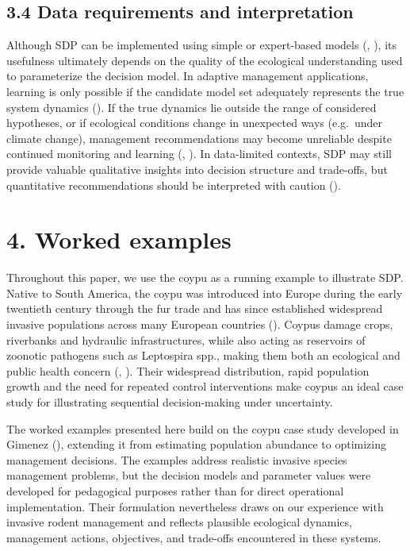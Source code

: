 \documentclass[
  11pt,
  a4paper,
]{article}
\begin{document}
\subsection{3.4 Data requirements and interpretation}\label{data-requirements-and-interpretation}

Although SDP can be implemented using simple or expert-based models (, ), its usefulness ultimately depends on the quality of the ecological understanding used to parameterize the decision model. In adaptive management applications, learning is only possible if the candidate model set adequately represents the true system dynamics (). If the true dynamics lie outside the range of considered hypotheses, or if ecological conditions change in unexpected ways (e.g.~under climate change), management recommendations may become unreliable despite continued monitoring and learning (, ). In data-limited contexts, SDP may still provide valuable qualitative insights into decision structure and trade-offs, but quantitative recommendations should be interpreted with caution ().

\section{4. Worked examples}\label{worked-examples}

Throughout this paper, we use the coypu as a running example to illustrate SDP. Native to South America, the coypu was introduced into Europe during the early twentieth century through the fur trade and has since established widespread invasive populations across many European countries (). Coypus damage crops, riverbanks and hydraulic infrastructures, while also acting as reservoirs of zoonotic pathogens such as Leptospira spp., making them both an ecological and public health concern (, ). Their widespread distribution, rapid population growth and the need for repeated control interventions make coypus an ideal case study for illustrating sequential decision-making under uncertainty.

The worked examples presented here build on the coypu case study developed in Gimenez (), extending it from estimating population abundance to optimizing management decisions. The examples address realistic invasive species management problems, but the decision models and parameter values were developed for pedagogical purposes rather than for direct operational implementation. Their formulation nevertheless draws on our experience with invasive rodent management and reflects plausible ecological dynamics, management actions, objectives, and trade-offs encountered in these systems.
\end{document}
